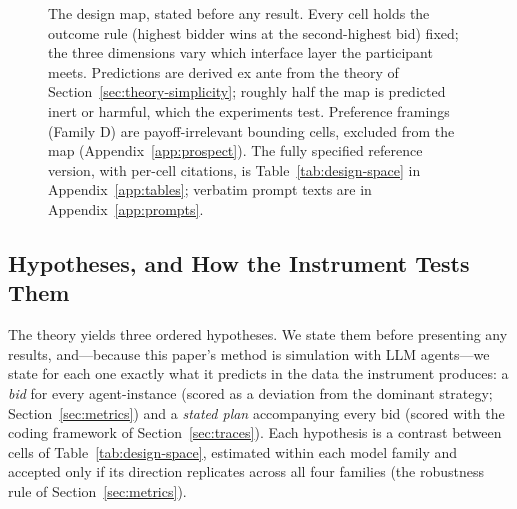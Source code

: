 \begin{figure}[t]
\caption{The design map, stated before any result. Every cell holds the outcome rule (highest bidder wins at the second-highest bid) fixed; the three dimensions vary which interface layer the participant meets. Predictions are derived ex ante from the theory of Section~\ref{sec:theory-simplicity}; roughly half the map is predicted inert or harmful, which the experiments test. Preference framings (Family D) are payoff-irrelevant bounding cells, excluded from the map (Appendix~\ref{app:prospect}). The fully specified reference version, with per-cell citations, is Table~\ref{tab:design-space} in Appendix~\ref{app:tables}; verbatim prompt texts are in Appendix~\ref{app:prompts}.}
\label{fig:design-space}
\end{figure}

\subsection{Hypotheses, and How the Instrument Tests Them}\label{sec:theory-hypotheses}

The theory yields three ordered hypotheses. We state them before presenting any results, and---because this paper's method is simulation with LLM agents---we state for each one exactly what it predicts in the data the instrument produces: a \emph{bid} for every agent-instance (scored as a deviation from the dominant strategy; Section~\ref{sec:metrics}) and a \emph{stated plan} accompanying every bid (scored with the coding framework of Section~\ref{sec:traces}). Each hypothesis is a contrast between cells of Table~\ref{tab:design-space}, estimated within each model family and accepted only if its direction replicates across all four families (the robustness rule of Section~\ref{sec:metrics}).

